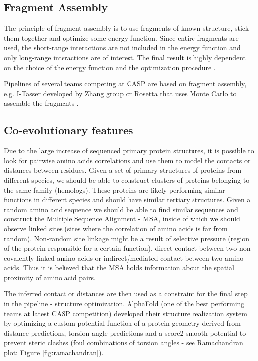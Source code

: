 \subsection{Fragment Assembly}

The principle of fragment assembly is to use fragments of known structure, stick them together and optimize some energy function. 
Since entire fragments are used, the short-range interactions are not included in the energy function and only long-range interactions are of interest. 
The final result is highly dependent on the choice of the energy function and the optimization procedure \cite{fragments}.

Pipelines of several teams competing at CASP are based on fragment assembly, e.g. I-Tasser developed by Zhang group \cite{zhang} or Rosetta that uses Monte Carlo to assemble the fragments \cite{rosetta}.

\subsection{Co-evolutionary features}

Due to the large increase of sequenced primary protein structures, it is possible to look for pairwise amino acids correlations and use them to model the contacts or distances between residues.
Given a set of primary structures of proteins from different species, we should be able to construct clusters of proteins belonging to the same family (homologs). 
These proteins are likely performing similar functions in different species and should have similar tertiary structures. 
Given a random amino acid sequence we should be able to find similar sequences and construct the Multiple Sequence Alignment - MSA, inside of which we should observe linked sites (sites where the correlation of amino acids is far from random). 
Non-random site linkage might be a result of selective pressure (region of the protein responsible for a certain function), direct contact between two non-covalently linked amino acids or indirect/mediated contact between two amino acids. 
Thus it is believed that the MSA holds information about the spatial proximity of amino acid pairs.

The inferred contact or distances are then used as a constraint for the final step in the pipeline - structure optimization. 
AlphaFold (one of the best performing teams at latest CASP competition) developed their structure realization system by optimizing a custom potential function of a protein geometry derived from distance predictions, torsion angle predictions and a score2-smooth potential to prevent steric clashes (foul combinations of torsion angles - see Ramachandran plot: Figure \ref{fig:ramachandran}).

